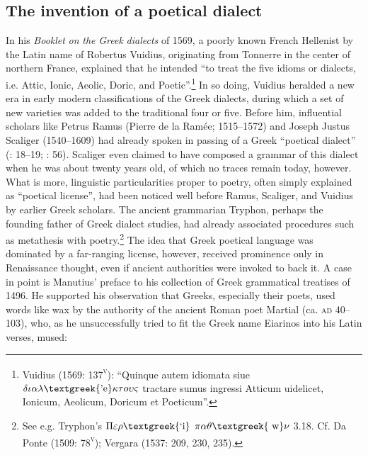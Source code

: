 \documentclass[output=paper]{langsci/langscibook}
\begin{document}
\subsection{The invention of a poetical dialect}
\hypertarget{Toc19704813}{}
In his \textit{Booklet} \textit{on} \textit{the} \textit{Greek} \textit{dialects} of 1569, a poorly known French Hellenist by the Latin name of Robertus Vuidius, originating from Tonnerre in the center of northern France, explained that he intended “to treat the five idioms or dialects, i.e. Attic, Ionic, Aeolic, Doric, and Poetic”.\footnote{Vuidius (1569: 137\textsc{\textsuperscript{v}}): “Quinque autem idiomata siue $\delta \iota \alpha \lambda \text{\textgreek{'e}}\kappa \tau o\upsilon \varsigma $ tractare sumus ingressi Atticum uidelicet, Ionicum, Aeolicum, Doricum et Poeticum”.} In so doing, Vuidius heralded a new era in early modern classifications of the Greek dialects, during which a set of new varieties was added to the traditional four or five. Before him, influential scholars like Petrus Ramus (Pierre de la Ramée; 1515–1572) and Joseph Justus Scaliger (1540–1609) had already spoken in passing of a Greek “poetical dialect” (\citealt{Ramus1560}: 18–19; \citealt{Scaliger1594}: 56). Scaliger even claimed to have composed a grammar of this dialect when he was about twenty years old, of which no traces remain today, however. What is more, linguistic particularities proper to poetry, often simply explained as “poetical license”, had been noticed well before Ramus, Scaliger, and Vuidius by earlier Greek scholars. The ancient grammarian Tryphon, perhaps the founding father of Greek dialect studies, had already associated procedures such as metathesis with poetry.\footnote{See e.g. Tryphon’s $\Pi \varepsilon \rho \text{\textgreek{`i}}$ $\pi \alpha \theta \text{\textgreek{~w}}\nu $ 3.18. Cf. Da Ponte (1509: 78\textsc{\textsuperscript{v}}); Vergara (1537: 209, 230, 235).} The idea that Greek poetical language was dominated by a far-ranging license, however, received prominence only in Renaissance thought, even if ancient authorities were invoked to back it. A case in point is Manutius’ preface to his collection of Greek grammatical treatises of 1496. He supported his observation that Greeks, especially their poets, used words like wax by the authority of the ancient Roman poet Martial (ca. \textsc{ad} 40–103), who, as he unsuccessfully tried to fit the Greek name Eiarinos into his Latin verses, mused:
\end{document}
